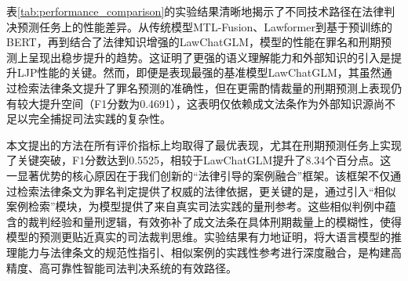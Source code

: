表\ref{tab:performance_comparison}的实验结果清晰地揭示了不同技术路径在法律判决预测任务上的性能差异。从传统模型MTL-Fusion、Lawformer到基于预训练的BERT，再到结合了法律知识增强的LawChatGLM，模型的性能在罪名和刑期预测上呈现出稳步提升的趋势。这证明了更强的语义理解能力和外部知识的引入是提升LJP性能的关键。然而，即便是表现最强的基准模型LawChatGLM，其虽然通过检索法律条文提升了罪名预测的准确性，但在更需酌情裁量的刑期预测上表现仍有较大提升空间（F1分数为0.4691），这表明仅依赖成文法条作为外部知识源尚不足以完全捕捉司法实践的复杂性。

本文提出的方法在所有评价指标上均取得了最优表现，尤其在刑期预测任务上实现了关键突破，F1分数达到0.5525，相较于LawChatGLM提升了8.34个百分点。这一显著优势的核心原因在于我们创新的“法律引导的案例融合”框架。该框架不仅通过检索法律条文为罪名判定提供了权威的法律依据，更关键的是，通过引入“相似案例检索”模块，为模型提供了来自真实司法实践的量刑参考。这些相似判例中蕴含的裁判经验和量刑逻辑，有效弥补了成文法条在具体刑期裁量上的模糊性，使得模型的预测更贴近真实的司法裁判思维。实验结果有力地证明，将大语言模型的推理能力与法律条文的规范性指引、相似案例的实践性参考进行深度融合，是构建高精度、高可靠性智能司法判决系统的有效路径。


